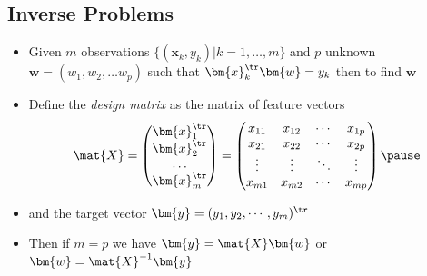 \begin{slide}
\section{Inverse Problems}

\begin{PauseHighLight}
  \begin{itemize}
  \item Given $m$ observations $\{(\bm{x}_k, y_k)| k=1,\ldots,m\}$ and
    $p$ unknown $\bm{w}=(w_1,w_2, \ldots w_p)$ such that
    $\bm{x}_k^\tr \bm{w} = y_k$ then to find $\bm{w}$\pause
\item Define the \textit{design matrix} as the matrix of feature vectors
  \begin{displaymath}
    \mat{X} = 
    \begin{pmatrix}
      \bm{x}_1^\tr \\ \bm{x}_2^\tr \\ \hdots \\ \bm{x}_m^\tr
    \end{pmatrix} =
    \begin{pmatrix}
      x_{11} & x_{12} & \cdots & x_{1p}\\
      x_{21} & x_{22} & \cdots & x_{2p}\\
      \vdots & \vdots & \ddots & \vdots \\
      x_{m1} & x_{m2} & \cdots & x_{mp}
    \end{pmatrix}\pause
  \end{displaymath}
\item and the target vector $\bm{y} = (y_1, y_2, \cdots, y_m)^\tr$\pause
\item Then if $m=p$ we have $\bm{y} = \mat{X} \bm{w}$ or $\bm{w} =
  \mat{X}^{-1} \bm{y}$\pause
\end{itemize}

\end{PauseHighLight}
\end{slide}


